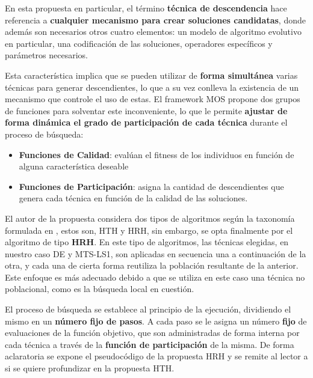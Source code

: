En esta propuesta en particular, el término \textbf{técnica de descendencia} hace referencia a \textbf{cualquier mecanismo para crear soluciones candidatas}, donde además son necesarios otros cuatro elementos: un modelo de algoritmo evolutivo en particular, una codificación de las soluciones, operadores específicos y parámetros necesarios. 

Esta característica implica que se pueden utilizar de \textbf{forma simultánea} varias técnicas para generar descendientes, lo que a su vez conlleva la existencia de un mecanismo que controle el uso de estas. El framework MOS propone dos grupos de funciones para solventar este inconveniente, lo que le permite \textbf{ajustar de forma dinámica el grado de participación de cada técnica} durante el proceso de búsqueda:

\begin{itemize}
	\item \textbf{Funciones de Calidad}: evalúan el fitness de los individuos en función de alguna característica deseable
	\item \textbf{Funciones de Participación}: asigna la cantidad de descendientes que genera cada técnica en función de la calidad de las soluciones.
\end{itemize}

El autor de la propuesta considera dos tipos de algoritmos según la taxonomía formulada en \cite{TaxonomyEAs}, estos son, HTH y HRH, sin embargo, se opta finalmente por el algoritmo de tipo \textbf{HRH}. En este tipo de algoritmos, las técnicas elegidas, en nuestro caso DE y MTS-LS1, son aplicadas en secuencia una a continuación de la otra, y cada una de cierta forma reutiliza la población resultante de la anterior. Este enfoque es más adecuado debido a que se utiliza en este caso una técnica no poblacional, como es la búsqueda local en cuestión.

El proceso de búsqueda se establece al principio de la ejecución, dividiendo el mismo en un \textbf{número fijo de pasos}. A cada paso se le asigna un número \textbf{fijo} de evaluaciones de la función objetivo, que son administradas de forma interna por cada técnica a través de la \textbf{función de participación} de la misma. De forma aclaratoria se expone el pseudocódigo de la propuesta HRH y se remite al lector a \cite{MOS2010} si se quiere profundizar en la propuesta HTH.


